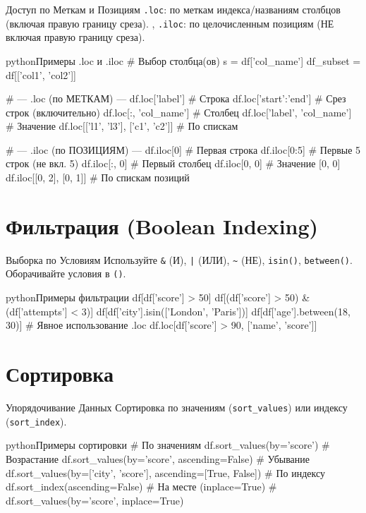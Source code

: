     \begin{textbox}{Доступ по Меткам и Позициям}
    \texttt{.loc}: по меткам индекса/названиям столбцов (включая правую границу среза). \sep
    \texttt{.iloc}: по целочисленным позициям (НЕ включая правую границу среза).
    \begin{codebox}{python}{Примеры .loc и .iloc}
    # Выбор столбца(ов)
    s = df['col_name']
    df_subset = df[['col1', 'col2']]
    
    # --- .loc (по МЕТКАМ) ---
    df.loc['label'] # Строка
    df.loc['start':'end'] # Срез строк (включительно)
    df.loc[:, 'col_name'] # Столбец
    df.loc['label', 'col_name'] # Значение
    df.loc[['l1', 'l3'], ['c1', 'c2']] # По спискам
    
    # --- .iloc (по ПОЗИЦИЯМ) ---
    df.iloc[0] # Первая строка
    df.iloc[0:5] # Первые 5 строк (не вкл. 5)
    df.iloc[:, 0] # Первый столбец
    df.iloc[0, 0] # Значение [0, 0]
    df.iloc[[0, 2], [0, 1]] # По спискам позиций
    \end{codebox}
    \end{textbox}
    
    \section{Фильтрация (Boolean Indexing)}
    
    \begin{myexampleblock}{Выборка по Условиям}
    Используйте \texttt{\&} (И), \texttt{|} (ИЛИ), \texttt{\textasciitilde} (НЕ), \texttt{isin()}, \texttt{between()}. Оборачивайте условия в \texttt{()}.
    \begin{codebox}{python}{Примеры фильтрации}
    df[df['score'] > 50]
    df[(df['score'] > 50) & (df['attempts'] < 3)]
    df[df['city'].isin(['London', 'Paris'])]
    df[df['age'].between(18, 30)]
    # Явное использование .loc
    df.loc[df['score'] > 90, ['name', 'score']]
    \end{codebox}
    \end{myexampleblock}
    
    \section{Сортировка}
    
    \begin{textbox}{Упорядочивание Данных}
    Сортировка по значениям (\texttt{sort\_values}) или индексу (\texttt{sort\_index}).
    \begin{codebox}{python}{Примеры сортировки}
    # По значениям
    df.sort_values(by='score') # Возрастание
    df.sort_values(by='score', ascending=False) # Убывание
    df.sort_values(by=['city', 'score'], ascending=[True, False])
    # По индексу
    df.sort_index(ascending=False)
    # На месте (inplace=True)
    # df.sort_values(by='score', inplace=True)
    \end{codebox}
    \end{textbox}
    
